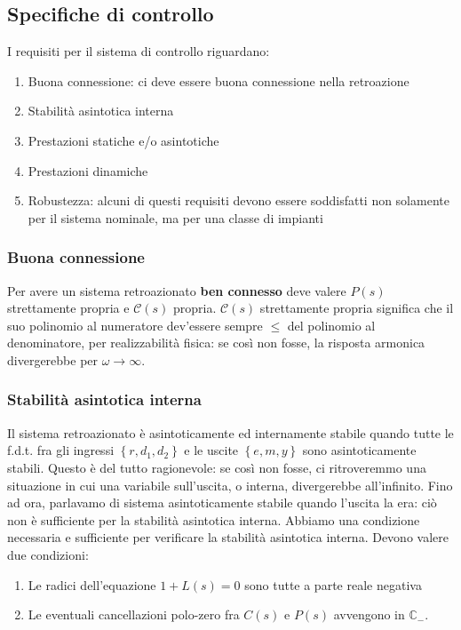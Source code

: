 \documentclass[11pt]{article}
\begin{document}
\subsection{Specifiche di controllo}
I requisiti per il sistema di controllo riguardano:
\begin{enumerate}
    \item Buona connessione: ci deve essere buona connessione nella retroazione
    \item Stabilità asintotica interna
    \item Prestazioni statiche e/o asintotiche 
    \item Prestazioni dinamiche
    \item Robustezza: alcuni di questi requisiti devono essere soddisfatti non solamente per il sistema nominale, ma per una classe di impianti
\end{enumerate}
\subsubsection{Buona connessione}
Per avere un sistema retroazionato \textbf{ben connesso} deve valere $P(s)$ strettamente propria e $\mathcal{C}(s)$ propria. $\mathcal{C}(s)$ strettamente propria significa che il suo polinomio al numeratore dev'essere sempre $\le$ del polinomio al denominatore, per realizzabilità fisica: se così non fosse, la risposta armonica divergerebbe per $\omega\rightarrow\infty$. 
\subsubsection{Stabilità asintotica interna}
Il sistema retroazionato è asintoticamente ed internamente stabile quando tutte le f.d.t. fra gli ingressi $\left\{r,d_1,d_2\right\}$ e le uscite $\left\{e,m,y\right\}$ sono asintoticamente stabili. Questo è del tutto ragionevole: se così non fosse, ci ritroveremmo una situazione in cui una variabile sull'uscita, o interna, divergerebbe all'infinito. 
Fino ad ora, parlavamo di sistema asintoticamente stabile quando l'uscita la era: ciò non è sufficiente per la stabilità asintotica interna. Abbiamo una condizione necessaria e sufficiente per verificare la stabilità asintotica interna. Devono valere due condizioni:
\begin{enumerate}
    \item Le radici dell'equazione $1+L(s)=0$ sono tutte a parte reale negativa 
    \item Le eventuali cancellazioni polo-zero fra $C(s)$ e $P(s)$ avvengono in $\mathbb{C}_-$.
\end{enumerate}
\end{document}
